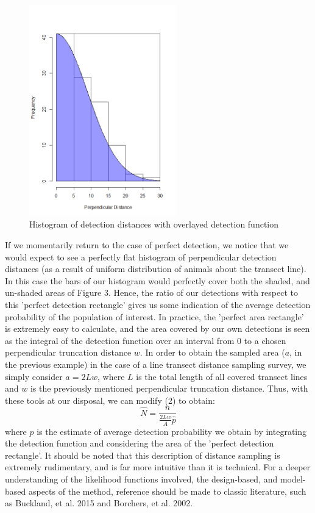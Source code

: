 \documentclass[11pt]{article}
\begin{document}
\begin{multicols}{2}
\begin{figure}[H]
\centering
\includegraphics[width=6.38cm]{DistHistDetec}
\caption{Histogram of detection distances with overlayed detection function}
\end{figure}

If we momentarily return to the case of perfect detection, we notice that we would expect to see a perfectly flat histogram of perpendicular detection distances (as a result of uniform distribution of animals about the transect line). In this case the bars of our histogram would perfectly cover both the shaded, and un-shaded areas of Figure 3. Hence, the ratio of our detections with respect to this 'perfect detection rectangle' gives us some indication of the average detection probability of the population of interest. In practice, the 'perfect area rectangle' is extremely easy to calculate, and the area covered by our own detections is seen as the integral of the detection function over an interval from $0$ to a chosen perpendicular truncation distance $w$. In order to obtain the sampled area ($a$, in the previous example) in the case of a line transect distance sampling survey, we simply consider $a=2Lw$, where $L$ is the total length of all covered transect lines and $w$ is the previously mentioned perpendicular truncation distance. Thus, with these tools at our disposal, we can modify (2) to obtain:
\begin{equation}
\hat{N}=\frac{n}{\frac{2Lw}{A}\hat{p}}
\end{equation}
where $\hat{p}$ is the estimate of average detection probability we obtain by integrating the detection function and considering the area of the 'perfect detection rectangle'. It should be noted that this description of distance sampling is extremely rudimentary, and is far more intuitive than it is technical. For a deeper understanding of the likelihood functions involved, the design-based, and model-based aspects of the method, reference should be made to classic literature, such as Buckland, et al. 2015 and Borchers, et al. 2002. 


\end{multicols}
\end{document}
